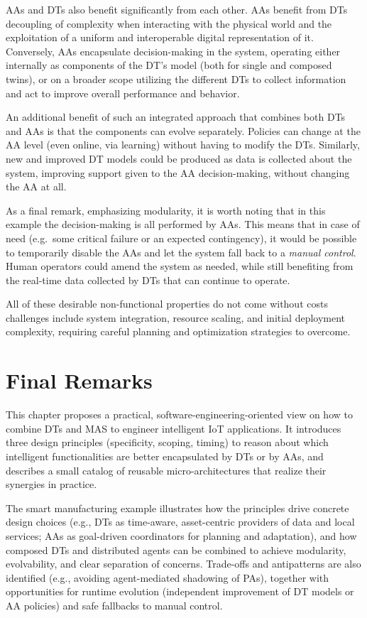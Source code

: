 AAs and DTs also benefit significantly from each other. 
AAs benefit from DTs decoupling of complexity when interacting with the physical world and the exploitation of a uniform and interoperable digital representation of it. Conversely, AAs encapsulate decision-making in the system, operating either internally as components of the DT's model (both for single and composed twins), or on a broader scope utilizing the different DTs to collect information and act to improve overall performance and behavior.

An additional benefit of such an integrated approach that combines both DTs and AAs is that the components can evolve separately.
%
Policies can change at the AA level (even online, via learning) without having to modify the DTs. 
Similarly, new and improved DT models could be produced as data is collected about the system, improving support given to the AA decision-making, without changing the AA at all. 

As a final remark, emphasizing modularity, it is worth noting that in this example the decision-making is all performed by AAs. This means that in case of need (e.g.\ some critical failure or an expected contingency), it would be possible to temporarily disable the AAs and let the system fall back to a \emph{manual control}.
Human operators could amend the system as needed, while still benefiting from the real-time data collected by DTs that can continue to operate.

All of these desirable non-functional properties do not come without costs challenges include system integration, resource scaling, and initial deployment complexity, requiring careful planning and optimization strategies to overcome.

\section{Final Remarks}

This chapter proposes a practical, software-engineering-oriented view on how to combine \acp{DT} and \ac{MAS} to engineer intelligent \ac{IoT} applications. 
It introduces three design principles (specificity, scoping, timing) to reason about which intelligent functionalities are better encapsulated by DTs or by AAs,
and describes a small catalog of reusable micro-architectures that realize their synergies in practice.

The smart manufacturing example illustrates how the principles drive concrete design choices (e.g., DTs as time-aware, asset-centric providers of data and local services; AAs as goal-driven coordinators for planning and adaptation), and how composed DTs and distributed agents can be combined to achieve modularity, evolvability, and clear separation of concerns. 
Trade-offs and antipatterns are also identified (e.g., avoiding agent-mediated shadowing of PAs), together with opportunities for runtime evolution (independent improvement of DT models or AA policies) and safe fallbacks to manual control.

